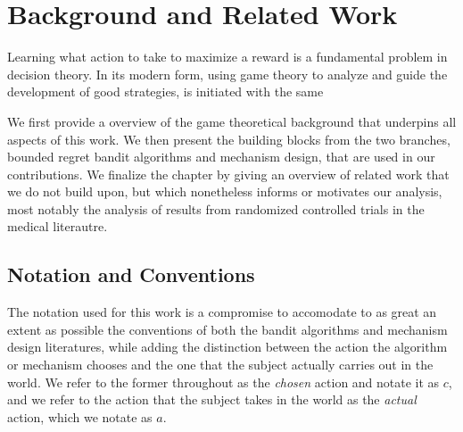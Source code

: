 \chapter{Background and Related Work}
\label{cha:background}






Learning what action to take to maximize a reward is a fundamental problem in decision theory. In its modern form, using game theory to analyze and guide the development of good strategies, is initiated with the same


We first provide a overview of the game theoretical background that underpins all aspects of this work.
We then present the building blocks from the two branches, bounded regret bandit algorithms and mechanism design, that are used in our contributions.
We finalize the chapter by giving an overview of related work that we do not build upon, but which nonetheless informs or motivates our analysis, most notably the analysis of results from randomized controlled trials in the medical literautre. 



\section{Notation and Conventions}


The notation used for this work is a compromise to accomodate to as great an extent as possible the conventions of both the bandit algorithms and mechanism design literatures, while adding the distinction between the action the algorithm or mechanism chooses and the one that the subject actually carries out in the world. We refer to the former throughout as the \emph{chosen} action and notate it as $c$, and we refer to the action that the subject takes in the world as the \emph{actual} action, which we notate as $a$.

